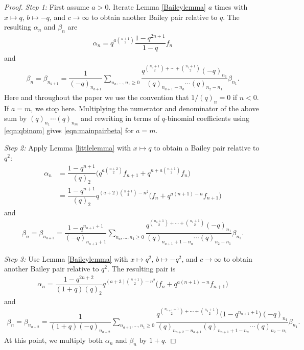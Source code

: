 \begin{proof}
	{\it Step 1\emph{:}} First assume $a > 0$. Iterate Lemma \ref{Baileylemma} $a$ times with $x\mapsto q$, $b\mapsto -q$, and $c\rightarrow \infty$ to obtain another Bailey pair relative to $q$. The resulting $\alpha_n$ and $\beta_n$ are
	\begin{align}
		\alpha_n=q^{a\binom{n+1}{2}}\dfrac{1-q^{2n+1}}{1-q}f_n
		\label{eqn:alphafn}
	\end{align}
	and
	\begin{align}
		\beta_n=\beta_{n_{a+1}}=
		\dfrac{1}{(-q)_{n_{a+1}}}\sum_{n_a,\dots,n_1\geq 0}
		\dfrac{q^{\binom{n_a+1}{2}+\cdots+\binom{n_1+1}{2}}(-q)_{n_1}}{(q)_{n_{a+1}-n_a}\cdots (q)_{n_2-n_1}}\beta_{n_1}. \label{eqn:betastep1}
	\end{align}
	Here and throughout the paper we use the convention that $1/(q)_n = 0$ if $n <0$.
	If $a=m$, we stop here. Multiplying the numerator and denominator of the above sum by $(q)_{n_1} \cdots (q)_{n_m}$ and rewriting in terms of $q$-binomial coefficients using \eqref{eqn:qbinom} gives \eqref{eqn:mainpairbeta} for $a=m$.
	
	{\it Step 2\emph{:}} Apply Lemma \ref{littlelemma} with $x \mapsto q$ to obtain a Bailey pair relative to $q^2$:
	\begin{align*}
		\alpha_n &{}= \dfrac{1-q^{n+1}}{(q)_2}\bigl(
		q^{a\binom{n+2}{2}}f_{n+1} + q^{n+a\binom{n+1}{2}}f_n\bigr)\\
		&{}=\dfrac{1-q^{n+1}}{(q)_2}q^{(a+2)\binom{n+1}{2}-n^2}
		\bigl(
		f_n+q^{a(n+1)-n}f_{n+1}\bigr)
	\end{align*}
	and
	\begin{align*}
		\beta_n=\beta_{n_{a+1}}=
		\dfrac{1-q^{n_{a+1}+1}}{(-q)_{n_{a+1}+1}}\sum_{n_a,\dots,n_1\geq 0}
		\dfrac{q^{\binom{n_a+1}{2}+\cdots+\binom{n_1+1}{2}}(-q)_{n_1}}{(q)_{n_{a+1}+1-n_a}\cdots (q)_{n_2-n_1}}\beta_{n_1}.
	\end{align*}
	
	
	{\it Step 3\emph{:}} Use Lemma \ref{Baileylemma} with $x\mapsto q^2$, $b\mapsto-q^2$, and $c \to \infty$ to obtain another Bailey pair relative to $q^2$. The resulting pair is
	\begin{align*}
		\alpha_n
		=\dfrac{1-q^{2n+2}}{(1+q)(q)_2}q^{(a+3)\binom{n+1}{2}-n^2}
		\bigl(
		f_n+q^{a(n+1)-n}f_{n+1}\bigr)
	\end{align*}
	and
	\begin{align*}
		\beta_n=\beta_{n_{a+2}}=
		\dfrac{1}{(1+q)(-q)_{n_{a+2}}}\sum_{n_{a+1},\dots,n_1\geq 0}
		\dfrac{q^{\binom{n_{a+1}+1}{2}+\cdots+\binom{n_1+1}{2}}\bigl(1-q^{n_{a+1}+1}\bigr)(-q)_{n_1}}{(q)_{n_{a+2}-n_{a+1}}(q)_{n_{a+1}+1-n_a}\cdots (q)_{n_2-n_1}}\beta_{n_1}.
	\end{align*}
	At this point, we multiply both
	$\alpha_n$ and $\beta_n$ by $1+q$.
	

\end{proof}
